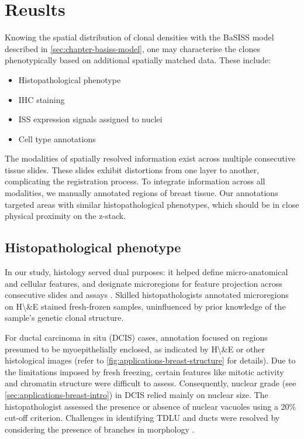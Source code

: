 \section{Reuslts}

Knowing the spatial distribution of clonal densities with the BaSISS model described in \cref{sec:chapter-basiss-model}, one may characterise the clones phenotypically based on additional spatially matched data. These include:

\begin{itemize}
    \item Histopathological phenotype
    \item \ac{IHC} staining
    \item \ac{ISS} expression signals assigned to nuclei
    \item Cell type annotations
\end{itemize}


The modalities of spatially resolved information exist across multiple consecutive tissue slides. These slides exhibit distortions from one layer to another, complicating the registration process. To integrate information across all modalities, we manually annotated regions of breast tissue. Our annotations targeted areas with similar histopathological phenotypes, which should be in close physical proximity on the z-stack.

\subsection{Histopathological phenotype}

In our study, histology served dual purposes: it helped define micro-anatomical and cellular features, and designate microregions for feature projection across consecutive slides and assays . Skilled histopathologists annotated microregions on \acf{H\&E} stained fresh-frozen samples, uninfluenced by prior knowledge of the sample's genetic clonal structure.

For ductal carcinoma in situ (DCIS) cases, annotation focused on regions presumed to be myoepithelially enclosed, as indicated by \ac{H\&E} or other histological images (refer to \cref{fig:applications-breast-structure} for details). Due to the limitations imposed by fresh freezing, certain features like mitotic activity and chromatin structure were difficult to assess. Consequently, nuclear grade (see \cref{sec:applications-breast-intro}) in \ac{DCIS} relied mainly on nuclear size. The histopathologist assessed the presence or absence of nuclear vacuoles using a 20\% cut-off criterion. Challenges in identifying \ac{TDLU} and ducts were resolved by considering the presence of branches in morphology .

